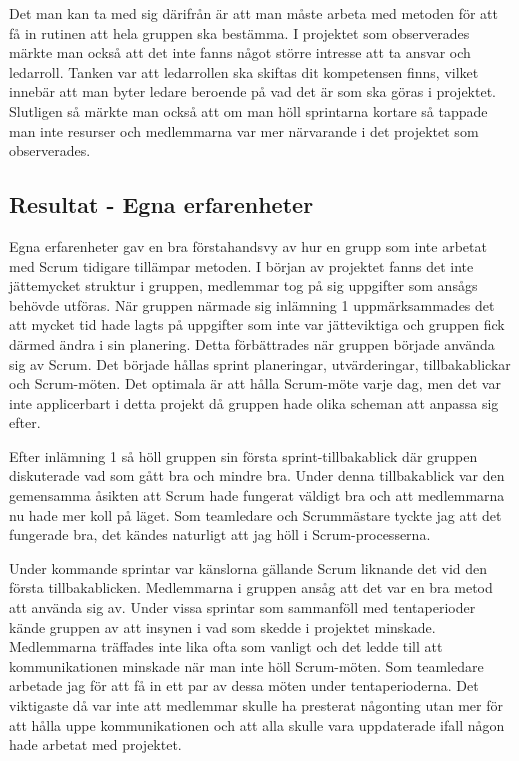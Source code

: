 Det man kan ta med sig därifrån är att man måste arbeta med metoden för att få in rutinen att hela gruppen ska bestämma. 
I projektet som observerades märkte man också att det inte fanns något större intresse att ta ansvar och ledarroll.
Tanken var att ledarrollen ska skiftas dit kompetensen finns, vilket innebär att man byter ledare beroende på vad det är som ska göras i projektet. 
Slutligen så märkte man också att om man höll sprintarna kortare så tappade man inte resurser och medlemmarna var mer närvarande i det projektet som observerades.

\subsection{Resultat - Egna erfarenheter}
Egna erfarenheter gav en bra förstahandsvy av hur en grupp som inte arbetat med Scrum tidigare tillämpar metoden. 
I början av projektet fanns det inte jättemycket struktur i gruppen, medlemmar tog på sig uppgifter som ansågs behövde utföras. 
När gruppen närmade sig inlämning 1 uppmärksammades det att mycket tid hade lagts på uppgifter som inte var jätteviktiga och gruppen fick därmed ändra i sin planering.
Detta förbättrades när gruppen började använda sig av Scrum. 
Det började hållas sprint planeringar, utvärderingar, tillbakablickar och Scrum-möten. Det optimala är att hålla Scrum-möte varje dag, men det var inte applicerbart i detta projekt då gruppen hade olika scheman att anpassa sig efter. 

Efter inlämning 1 så höll gruppen sin första sprint-tillbakablick där gruppen diskuterade vad som gått bra och mindre bra. 
Under denna tillbakablick var den gemensamma åsikten att Scrum hade fungerat väldigt bra och att medlemmarna nu hade mer koll på läget. 
Som teamledare och Scrummästare tyckte jag att det fungerade bra, det kändes naturligt att jag höll i Scrum-processerna. 

Under kommande sprintar var känslorna gällande Scrum liknande det vid den första tillbakablicken. 
Medlemmarna i gruppen ansåg att det var en bra metod att använda sig av. Under vissa sprintar som sammanföll med tentaperioder kände gruppen av att insynen i vad som skedde i projektet minskade.
Medlemmarna träffades inte lika ofta som vanligt och det ledde till att kommunikationen minskade när man inte höll Scrum-möten. Som teamledare arbetade jag för att få in ett par av dessa möten under tentaperioderna. 
Det viktigaste då var inte att medlemmar skulle ha presterat någonting utan mer för att hålla uppe kommunikationen och att alla skulle vara uppdaterade ifall någon hade arbetat med projektet.

